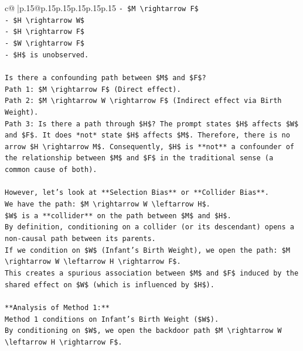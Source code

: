 \documentclass{article}
\begin{document}
{\begin{supertabular}{c@{$\;$}|p{.15\linewidth}@{}p{.15\linewidth}p{.15\linewidth}p{.15\linewidth}p{.15\linewidth}p{.15\linewidth}}
{{{\texttt{{-} \$M \textbackslash{}rightarrow F\$} \\
\texttt{{-} \$H \textbackslash{}rightarrow W\$} \\
\texttt{{-} \$H \textbackslash{}rightarrow F\$} \\
\texttt{{-} \$W \textbackslash{}rightarrow F\$} \\
\texttt{{-} \$H\$ is unobserved.} \\
\\ 
\texttt{Is there a confounding path between \$M\$ and \$F\$?} \\
\texttt{Path 1: \$M \textbackslash{}rightarrow F\$ (Direct effect).} \\
\texttt{Path 2: \$M \textbackslash{}rightarrow W \textbackslash{}rightarrow F\$ (Indirect effect via Birth Weight).} \\
\texttt{Path 3: Is there a path through \$H\$? The prompt states \$H\$ affects \$W\$ and \$F\$. It does *not* state \$H\$ affects \$M\$. Therefore, there is no arrow \$H \textbackslash{}rightarrow M\$. Consequently, \$H\$ is **not** a confounder of the relationship between \$M\$ and \$F\$ in the traditional sense (a common cause of both).} \\
\\ 
\texttt{However, let's look at **Selection Bias** or **Collider Bias**.} \\
\texttt{We have the path: \$M \textbackslash{}rightarrow W \textbackslash{}leftarrow H\$.} \\
\texttt{\$W\$ is a **collider** on the path between \$M\$ and \$H\$.} \\
\texttt{By definition, conditioning on a collider (or its descendant) opens a non{-}causal path between its parents.} \\
\texttt{If we condition on \$W\$ (Infant's Birth Weight), we open the path: \$M \textbackslash{}rightarrow W \textbackslash{}leftarrow H \textbackslash{}rightarrow F\$.} \\
\texttt{This creates a spurious association between \$M\$ and \$F\$ induced by the shared effect on \$W\$ (which is influenced by \$H\$).} \\
\\ 
\texttt{**Analysis of Method 1:**} \\
\texttt{Method 1 conditions on Infant's Birth Weight (\$W\$).} \\
\texttt{By conditioning on \$W\$, we open the backdoor path \$M \textbackslash{}rightarrow W \textbackslash{}leftarrow H \textbackslash{}rightarrow F\$.} \\
}}}
\end{supertabular}}
\end{document}
